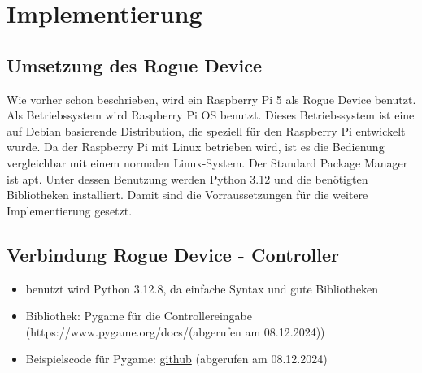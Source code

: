 \chapter{Implementierung}

\section{Umsetzung des Rogue Device}
Wie vorher schon beschrieben, wird ein Raspberry Pi 5 als Rogue Device benutzt. 
Als Betriebssystem wird Raspberry Pi OS benutzt. Dieses Betriebssystem ist eine auf Debian basierende Distribution, 
die speziell für den Raspberry Pi entwickelt wurde. Da der Raspberry Pi mit Linux betrieben wird, ist es die Bedienung
vergleichbar mit einem normalen Linux-System. Der Standard Package Manager ist apt. Unter dessen Benutzung werden 
Python 3.12 und die benötigten Bibliotheken installiert. Damit sind die Vorraussetzungen für die weitere Implementierung
gesetzt.

\section{Verbindung Rogue Device - Controller}
\begin{itemize}
    \item benutzt wird Python 3.12.8, da einfache Syntax und gute Bibliotheken
    \item Bibliothek: Pygame für die Controllereingabe (https://www.pygame.org/docs/(abgerufen am 08.12.2024))
    \item Beispielscode für Pygame: \href{https://github.com/kevinmcaleer/xbox_controller}{github} (abgerufen am 08.12.2024)
\end{itemize}

